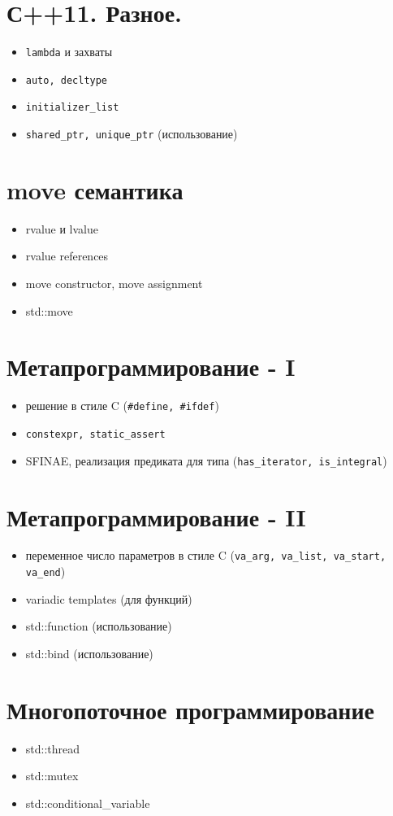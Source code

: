 \documentclass[11pt,dvipsnames]{report}
\begin{document}
\section{С++11. Разное.}
\begin{itemize}[noitemsep]
	\item \texttt{lambda} и захваты
	\item \texttt{auto, decltype}
	\item \texttt{initializer\_list}
	\item \texttt{shared\_ptr, unique\_ptr} (использование)
\end{itemize}

\section{move семантика}
\begin{itemize}[noitemsep]
	\item rvalue и lvalue
	\item rvalue references
	\item move constructor, move assignment
	\item std::move
\end{itemize}

\section{Метапрограммирование - I}
\begin{itemize}[noitemsep]
	\item решение в стиле C (\texttt{\#define, \#ifdef})
	\item \texttt{constexpr, static\_assert}
	\item SFINAE, реализация предиката для типа (\texttt{has\_iterator, is\_integral})
\end{itemize}

\section{Метапрограммирование - II}
\begin{itemize}[noitemsep]
	\item переменное число параметров в стиле C (\texttt{va\_arg, va\_list, va\_start, va\_end})
	\item variadic templates (для функций)
	\item std::function (использование)
	\item std::bind (использование)
\end{itemize}

\section{Многопоточное программирование}
\begin{itemize}[noitemsep]
	\item std::thread
	\item std::mutex
	\item std::conditional\_variable
\end{itemize}
\end{document}
